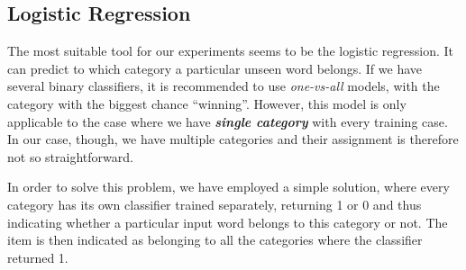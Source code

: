 \documentclass[letterpaper]{article}
\newcommand{\todofn}[1] {
 \footnote{\textbf{TODO : #1}}}
\begin{document}
\subsection{Logistic Regression}



The most suitable tool for our experiments seems to be the logistic regression. It can predict to which category a particular unseen word belongs. If we have several binary classifiers, it is recommended to use \emph{one-vs-all} models, with the category with the biggest chance ``winning''. However, this model is only applicable to the case where we have \textbf{\emph{single category}} with every training case. 
In our case, though, we have multiple categories and their assignment is therefore not so straightforward.

In order to solve this problem, we have employed a simple solution, where every category has its own classifier trained separately, returning 1 or 0 and thus indicating whether a particular input word belongs to this category or not.
The item is then indicated as belonging to all the categories where the classifier returned 1.
\end{document}
